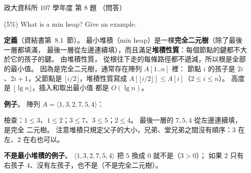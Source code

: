 \begin{pastexam}[label={px:nccu-107-dsa-08}]{政大資科所 107 學年度 第 8 題}
（問答）

(5\%) What is a min heap? Give an example.
\end{pastexam}

\begin{pastsoln}
\textbf{定義}（資結書第~8.1~節）。 最小堆積（min heap）是一棵\textbf{完全二元樹}（除了最後一層都填滿，
最後一層從左邊連續填），而且滿足\textbf{堆積性質}：每個節點的鍵都不大於它的孩子的鍵。 由堆積性質，
從根往下走的每條路徑都不遞減，所以根是全部的最小值。 因為是完全二元樹，通常存在陣列 $A[1..n]$ 裡：
節點 $i$ 的孩子是 $2i$、$2i + 1$，父節點是 $\lfloor i/2 \rfloor$，堆積性質寫成
$A[\lfloor i/2 \rfloor] \le A[i]$（$2 \le i \le n$）。 高度是 $\lfloor \lg n \rfloor$，插入和取出最小值
都是 $O(\lg n)$。

\textbf{例子}。 陣列 $A = \langle 1, 3, 2, 7, 5, 4 \rangle$：
\begin{center}
\end{center}
檢查：$1 \le 3$、$1 \le 2$；$3 \le 7$、$3 \le 5$；$2 \le 4$。 最後一層的 $7, 5, 4$ 從左邊連續填，是完全
二元樹。 注意堆積只規定父子的大小，兄弟、堂兄弟之間沒有順序：$3$ 在左、$2$ 在右也可以。

\textbf{不是最小堆積的例子}。 $\langle 1, 3, 2, 7, 5, 4 \rangle$ 把 $5$ 換成 $0$ 就不是（$3 > 0$）；
如果 $2$ 只有右孩子 $4$、沒有左孩子，也不是（不是完全二元樹）。
\end{pastsoln}
